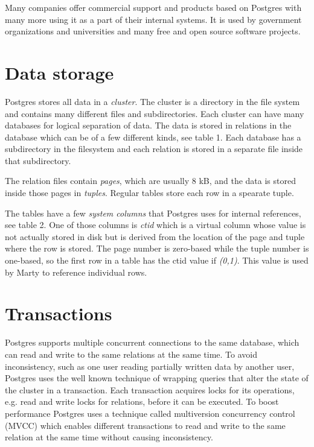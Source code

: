 \documentclass[a4paper,12pt,twoside,BCOR=10mm]{scrbook}
\begin{document}
Many companies offer commercial support and products based on Postgres with many more using it as a part of their internal systems. It is used by government organizations and universities and many free and open source software projects.

\section{Data storage}
Postgres stores all data in a \textit{cluster}. The cluster is a directory in the file system and contains many different files and subdirectories. Each cluster can have many databases for logical separation of data. The data is stored in relations in the database which can be of a few different kinds, see table 1. Each database has a subdirectory in the filesystem and each relation is stored in a separate file inside that subdirectory.


The relation files contain \textit{pages}, which are usually 8 kB, and the data is stored inside those pages in \textit{tuples}. Regular tables store each row in a spearate tuple.


The tables have a few \textit{system columns} that Postgres uses for internal references, see table 2. One of those columns is \textit{ctid} which is a virtual column whose value is not actually stored in disk but is derived from the location of the page and tuple where the row is stored. The page number is zero-based while the tuple number is one-based, so the first row in a table has the ctid value if \textit{(0,1)}. This value is used by Marty to reference individual rows.


\section{Transactions}
Postgres supports multiple concurrent connections to the same database, which can read and write to the same relations at the same time. To avoid inconsistency, such as one user reading partially written data by another user, Postgres uses the well known technique of wrapping queries that alter the state of the cluster in a transaction. Each transaction acquires locks for its operations, e.g. read and write locks for relations, before it can be executed. To boost performance Postgres uses a technique called multiversion concurrency control (MVCC) which enables different transactions to read and write to the same relation at the same time without causing inconsistency.
\end{document}
